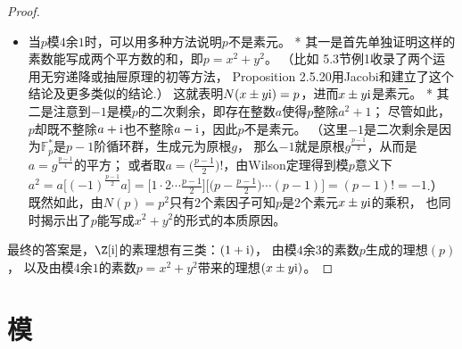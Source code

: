 \begin{enumerate}
\begin{proof}
\begin{itemize}
    \item 当$p$模$4$余$1$时，可以用多种方法说明$p$不是素元。
    * 其一是首先单独证明这样的素数能写成两个平方数的和，即$p=x^2+y^2$。
    （比如\cite{FeZ} 5.3节例1收录了两个运用无穷递降或抽屉原理的初等方法，
    \cite{Co} Proposition 2.5.20用Jacobi和建立了这个结论及更多类似的结论.）
    这就表明$N(x \pm y{\rm i})=p$，进而$x \pm y{\rm i}$是素元。
    * 其二是注意到$-1$是模$p$的二次剩余，即存在整数$a$使得$p$整除$a^2+1$；
    尽管如此，$p$却既不整除$a+{\rm i}$也不整除$a-{\rm i}$，因此$p$不是素元。
    （这里$-1$是二次剩余是因为$\mathbb{F}_p^*$是$p-1$阶循环群，生成元为原根$g$，
    那么$-1$就是原根$g^\frac{p-1}{2}$，从而是$a=g^\frac{p-1}{4}$的平方；
    或者取$a=\big(\frac{p-1}{2}\big)!$，由Wilson定理得到模$p$意义下
    $a^2=a\big[(-1)^{\frac{p-1}{2}}a\big]=\big[1\cdot2\cdots\frac{p-1}{2}\big]
    \big[\big(p-\frac{p-1}{2}\big)\cdots(p-1)\big]=(p-1)!=-1$.）
    既然如此，由$N(p)=p^2$只有$2$个素因子可知$p$是$2$个素元$x \pm y{\rm i}$的乘积，
    也同时揭示出了$p$能写成$x^2+y^2$的形式的本质原因。
    \end{itemize}

    最终的答案是，$\Z[{\rm i}]$的素理想有三类：$(1+{\rm i})$，
    由模$4$余$3$的素数$p$生成的理想$(p)$，
    以及由模$4$余$1$的素数$p=x^2+y^2$带来的理想$(x \pm y{\rm i})$。
\end{proof}
\end{enumerate}

\section{模}

